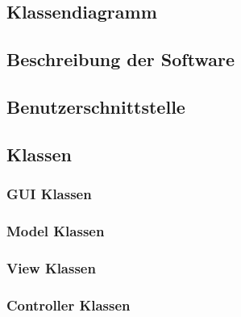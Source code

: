 \subsection{Klassendiagramm}

\subsection{Beschreibung der Software}

\subsection{Benutzerschnittstelle}

\subsection{Klassen}
\subsubsection{GUI Klassen}

\subsubsection{Model Klassen}

\subsubsection{View Klassen}

\subsubsection{Controller Klassen}